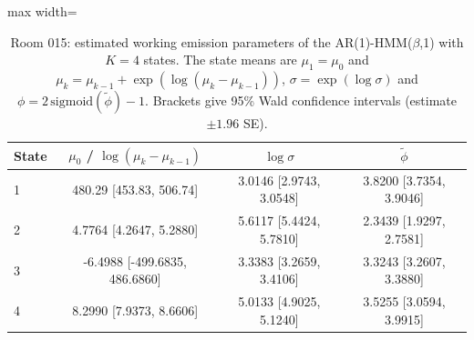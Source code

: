 \begin{table}[ht]
\centering
\begin{adjustbox}{max width=\textwidth}
\begin{tabular}{lccc}
\hline
State & $\mu_0$ / $\log(\mu_k - \mu_{k-1})$ & $\log \sigma$ & $\tilde{\phi}$ \\
\hline
1 & 480.29 [453.83, 506.74] & 3.0146 [2.9743, 3.0548] & 3.8200 [3.7354, 3.9046] \\
2 & 4.7764 [4.2647, 5.2880] & 5.6117 [5.4424, 5.7810] & 2.3439 [1.9297, 2.7581] \\
3 & -6.4988 [-499.6835, 486.6860] & 3.3383 [3.2659, 3.4106] & 3.3243 [3.2607, 3.3880] \\
4 & 8.2990 [7.9373, 8.6606] & 5.0133 [4.9025, 5.1240] & 3.5255 [3.0594, 3.9915] \\
\hline
\end{tabular}
\end{adjustbox}
\caption{Room 015: estimated working emission parameters of the AR(1)-HMM($\beta$,1) with $K=4$ states. The state means are $\mu_1 = \mu_0$ and $\mu_k = \mu_{k-1} + \exp(\log(\mu_k - \mu_{k-1}))$, $\sigma = \exp(\log \sigma)$ and $\phi = 2\,\mathrm{sigmoid}(\tilde{\phi}) - 1$. Brackets give 95\% Wald confidence intervals (estimate $\pm 1.96$ SE).}
\label{tab:params_working_emission_room_015_calibrated_anchor_random_search_ar1_hmm_beta_1_K4}
\end{table}

